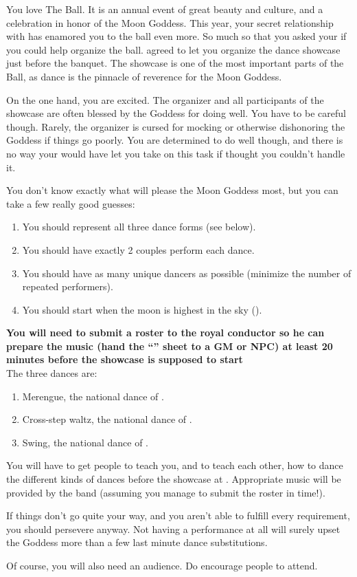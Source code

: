 \documentclass[green]{NeptuneBall}
\begin{document}
\name{\gDance{}}

You love The \cExExKing{} Ball. It is an annual event of great beauty and culture, and a celebration in honor of the Moon Goddess. This year, your secret relationship with \cDiplomat{} has enamored you to the ball even more. So much so that you asked your \cKing{\parent} if you could help organize the ball. \cKing{} agreed to let you organize the dance showcase just before the banquet. The showcase is one of the most important parts of the Ball, as dance is the pinnacle of reverence for the Moon Goddess.

On the one hand, you are excited. The organizer and all participants of the showcase are often blessed by the Goddess for doing well. You have to  be careful though. Rarely, the organizer is cursed for mocking or otherwise dishonoring the Goddess if things go poorly. You are determined to do well though, and there is no way your \cKing{\parent} would have let you take on this task if \cKing{\they} thought you couldn't handle it.

You don't know exactly what will please the Moon Goddess most, but you can take a few really good guesses:
\begin{enumerate}
	\item You should represent all three dance forms (see below).
	\item You should have exactly 2 couples perform each dance.
	\item You should have as many unique dancers as possible (minimize the number of repeated performers).
	\item You should start when the moon is highest in the sky (\cTOneFifty{}).
\end {enumerate}
\vspace{5mm}
{\bf You will need to submit a roster to the royal conductor so he can prepare the music (hand the ``\gRoster{}'' sheet to a GM or NPC) at least 20 minutes before the showcase is supposed to start}\\

The three dances are:
\begin{enumerate}
\item Merengue, the national dance of \pAtlantis{}.
\item Cross-step waltz, the national dance of \pPacifica{}.
\item Swing, the national dance of \pAmerica{}.
\end{enumerate}

You will have to get people to teach you, and to teach each other, how to dance the different kinds of dances before the showcase at {\bf \cTOneFifty{}}. Appropriate music will be provided by the band (assuming you manage to submit the roster in time!).

If things don't go quite your way, and you aren't able to fulfill every requirement, you should persevere anyway. Not having a performance at all will surely upset the Goddess more than a few last minute dance substitutions.

Of course, you will also need an audience. Do encourage people to attend.
\end{document}
